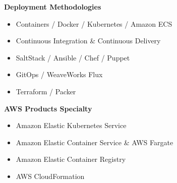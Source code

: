 \textbf{Deployment Methodologies}
\vspace{-7pt}
\begin{itemize}
    \item Containers / Docker / Kubernetes / Amazon ECS
    \item Continuous Integration \& Continuous Delivery
    \item SaltStack / Ansible / Chef / Puppet
    \item GitOps / WeaveWorks Flux
    \item Terraform / Packer
\end{itemize}

\textbf{AWS Products Specialty}
\vspace{-7pt}
\begin{itemize}
    \item Amazon Elastic Kubernetes Service
    \item Amazon Elastic Container Service \& AWS Fargate
    \item Amazon Elastic Container Registry
    \item AWS CloudFormation
\end{itemize}